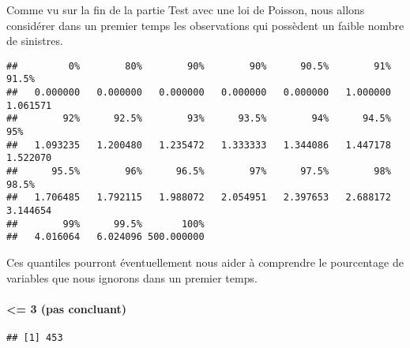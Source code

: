 \documentclass[
]{article}
\newenvironment{Shaded}{\begin{snugshade}}{\end{snugshade}}
\newcommand{\DecValTok}[1]{\textcolor[rgb]{0.00,0.00,0.81}{#1}}
\newcommand{\FloatTok}[1]{\textcolor[rgb]{0.00,0.00,0.81}{#1}}
\newcommand{\FunctionTok}[1]{\textcolor[rgb]{0.00,0.00,0.00}{#1}}
\newcommand{\NormalTok}[1]{#1}
\newcommand{\OtherTok}[1]{\textcolor[rgb]{0.56,0.35,0.01}{#1}}
\newcommand{\SpecialCharTok}[1]{\textcolor[rgb]{0.00,0.00,0.00}{#1}}
\begin{document}
Comme vu sur la fin de la partie Test avec une loi de Poisson, nous
allons considérer dans un premier temps les observations qui possèdent
un faible nombre de sinistres.

\begin{Shaded}
\end{Shaded}

\begin{verbatim}
##         0%        80%        90%        90%      90.5%        91%      91.5% 
##   0.000000   0.000000   0.000000   0.000000   0.000000   1.000000   1.061571 
##        92%      92.5%        93%      93.5%        94%      94.5%        95% 
##   1.093235   1.200480   1.235472   1.333333   1.344086   1.447178   1.522070 
##      95.5%        96%      96.5%        97%      97.5%        98%      98.5% 
##   1.706485   1.792115   1.988072   2.054951   2.397653   2.688172   3.144654 
##        99%      99.5%       100% 
##   4.016064   6.024096 500.000000
\end{verbatim}

Ces quantiles pourront éventuellement nous aider à comprendre le
pourcentage de variables que nous ignorons dans un premier temps.

\hypertarget{pas-concluant}{%
\paragraph{\textless= 3 (pas concluant)}\label{pas-concluant}}

\begin{Shaded}
\end{Shaded}

\begin{verbatim}
## [1] 453
\end{verbatim}
\end{document}
